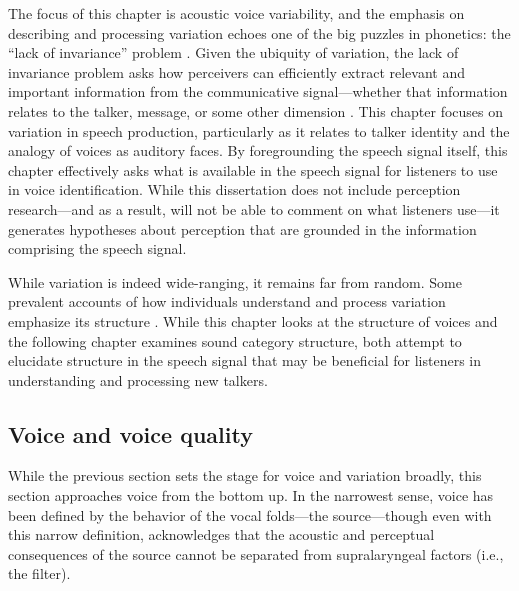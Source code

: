 The focus of this chapter is acoustic voice variability, and the emphasis on describing and processing variation echoes one of the big puzzles in phonetics: the ``lack of invariance'' problem \citep{liberman_1967_perception}. Given the ubiquity of variation, the lack of invariance problem asks how perceivers can efficiently extract relevant and important information from the communicative signal---whether that information relates to the talker, message, or some other dimension \citep{kleinschmidt_2018_sociolinguistic}. This chapter focuses on variation in speech production, particularly as it relates to talker identity and the analogy of voices as auditory faces. By foregrounding the speech signal itself, this chapter effectively asks what is available in the speech signal for listeners to use in voice identification. While this dissertation does not include perception research---and as a result, will not be able to comment on what listeners use---it generates hypotheses about perception that are grounded in the information comprising the speech signal.

While variation is indeed wide-ranging, it remains far from random. Some prevalent accounts of how individuals understand and process variation emphasize its structure \citep[e.g.,][]{chodroff_2017_structure, lee_2019_acoustic}. While this chapter looks at the structure of voices and the following chapter examines sound category structure, both attempt to elucidate structure in the speech signal that may be beneficial for listeners in understanding and processing new talkers. 

\subsection{Voice and voice quality}\label{ch3:sec:voicequality}

While the previous section sets the stage for voice and variation broadly, this section approaches voice from the bottom up. In the narrowest sense, voice has been defined by the behavior of the vocal folds---the source---though even with this narrow definition, \citet{garellek_2019_voice} acknowledges that the acoustic and perceptual consequences of the source cannot be separated from supralaryngeal factors (i.e., the filter). 

